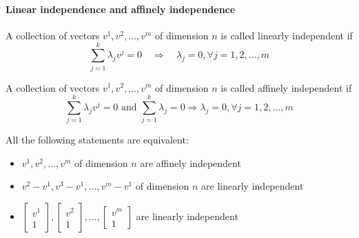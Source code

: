                 \paragraph{Linear independence and affinely independence}
                    A collection of vectors $v^1, v^2, \dots, v^m$ of dimension $n$ is called linearly independent if
                    \begin{equation*} 
                        \sum_{j=1}^k \lambda_j v^j = 0 \quad \Rightarrow \quad \lambda_j = 0, \forall j =1,2, \dots, m
                    \end{equation*}
                
                    A collection of vectors $v^1, v^2, \dots, v^m$ of dimension $n$ is called affinely independent if
                    \begin{equation*} 
                        \sum_{j=1}^k \lambda_j v^j = 0 \text{ and } \sum_{j=1}^k \lambda_j = 0 \Rightarrow \lambda_j = 0, \forall j =1,2, \dots, m 
                    \end{equation*} 

                    All the following statements are equivalent:
                    \begin{itemize}
                        \item $v^1, v^2, \dots, v^m$ of dimension $n$ are affinely independent
                        \item $v^2 - v^1, v^3-v^1, \dots, v^m-v^1$ of dimension $n$ are linearly independent
                        \item $\left [ \begin{matrix}v^1 \\ 1\end{matrix} \right ], \left [ \begin{matrix}v^2 \\ 1\end{matrix} \right ], \dots, \left [ \begin{matrix}v^m \\ 1\end{matrix} \right ]$ are linearly independent
                    \end{itemize}

